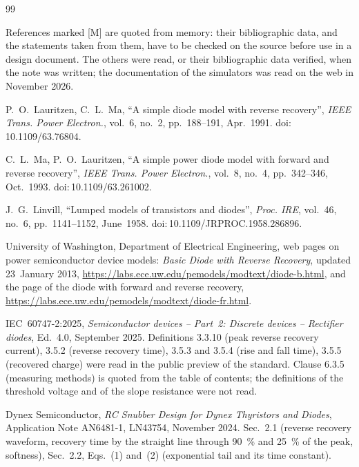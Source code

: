 \documentclass[10pt,a4paper]{scrartcl}
\begin{document}
\begin{thebibliography}{99}
\small
\item[] References marked [M] are quoted from memory: their bibliographic data, and the statements taken from them, have to be checked on the source before use in a design document. The others were read, or their bibliographic data verified, when the note was written; the documentation of the simulators was read on the web in November 2026.

P.~O.~Lauritzen, C.~L.~Ma, ``A simple diode model with reverse recovery'', \emph{IEEE Trans. Power Electron.}, vol.~6, no.~2, pp.~188--191, Apr.~1991. doi:\,10.1109/63.76804.

C.~L.~Ma, P.~O.~Lauritzen, ``A simple power diode model with forward and reverse recovery'', \emph{IEEE Trans. Power Electron.}, vol.~8, no.~4, pp.~342--346, Oct.~1993. doi:\,10.1109/63.261002.

J.~G.~Linvill, ``Lumped models of transistors and diodes'', \emph{Proc. IRE}, vol.~46, no.~6, pp.~1141--1152, June~1958. doi:\,10.1109/JRPROC.1958.286896.

University of Washington, Department of Electrical Engineering, web pages on power semiconductor device models: \emph{Basic Diode with Reverse Recovery}, updated 23~January 2013, \url{https://labs.ece.uw.edu/pemodels/modtext/diode-b.html}, and the page of the diode with forward and reverse recovery, \url{https://labs.ece.uw.edu/pemodels/modtext/diode-fr.html}.

IEC~60747-2:2025, \emph{Semiconductor devices -- Part~2: Discrete devices -- Rectifier diodes}, Ed.~4.0, September 2025. Definitions 3.3.10 (peak reverse recovery current), 3.5.2 (reverse recovery time), 3.5.3 and 3.5.4 (rise and fall time), 3.5.5 (recovered charge) were read in the public preview of the standard. Clause 6.3.5 (measuring methods) is quoted from the table of contents; the definitions of the threshold voltage and of the slope resistance were not read.

Dynex Semiconductor, \emph{RC Snubber Design for Dynex Thyristors and Diodes}, Application Note AN6481-1, LN43754, November 2024. Sec.~2.1 (reverse recovery waveform, recovery time by the straight line through \SI{90}{\percent} and \SI{25}{\percent} of the peak, softness), Sec.~2.2, Eqs.~(1) and~(2) (exponential tail and its time constant).


\end{thebibliography}
\end{document}
